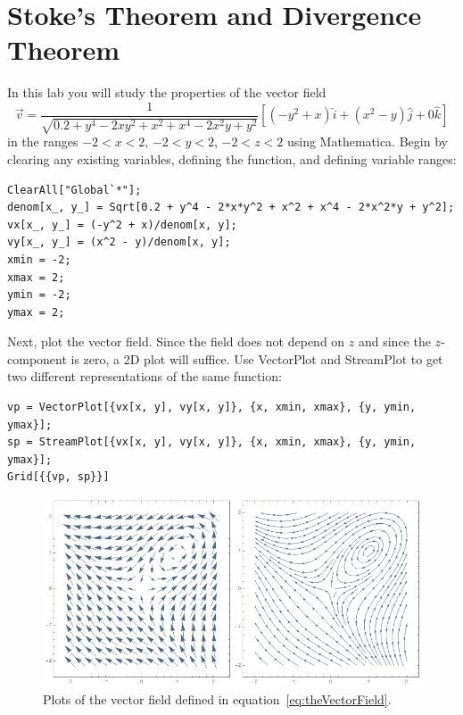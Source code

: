 \section{Stoke's Theorem and Divergence Theorem}

In this lab you will study the properties of the vector field
%
\begin{equation}
\label{eq:theVectorField}
\vec{v} = \frac{1}{\sqrt{0.2 + y^4 - 2xy^2 + x^2 + x^4 - 2x^2y + y^2}} \left[ \left(-y^2 + x \right) \hat{i} + \left( x^2 - y \right) \hat{j} + 0 \hat{k} \right]
\end{equation}
%
in the ranges $-2 < x < 2$, $-2 < y < 2$, $-2 < z < 2$ using Mathematica.
Begin by clearing any existing variables, defining the function, and defining variable ranges:
%
\begin{verbatim}
ClearAll["Global`*"];
denom[x_, y_] = Sqrt[0.2 + y^4 - 2*x*y^2 + x^2 + x^4 - 2*x^2*y + y^2];
vx[x_, y_] = (-y^2 + x)/denom[x, y];
vy[x_, y_] = (x^2 - y)/denom[x, y];
xmin = -2;
xmax = 2;
ymin = -2;
ymax = 2;
\end{verbatim}
%
Next, plot the vector field.
Since the field does not depend on $z$ and since the $z$-component is zero, a 2D plot will suffice.
Use VectorPlot and StreamPlot to get two different representations of the same function:
%
\begin{verbatim}
vp = VectorPlot[{vx[x, y], vy[x, y]}, {x, xmin, xmax}, {y, ymin, ymax}];
sp = StreamPlot[{vx[x, y], vy[x, y]}, {x, xmin, xmax}, {y, ymin, ymax}];
Grid[{{vp, sp}}]
\end{verbatim}
%
\begin{figure}[!h]
\centering
\includegraphics[scale=0.6]{figures/stokes-theorem/theVectorFieldPlots}
\caption{Plots of the vector field defined in equation~\ref{eq:theVectorField}.}
\label{fig:theVectorFieldPlots}
\end{figure}

\pagebreak

